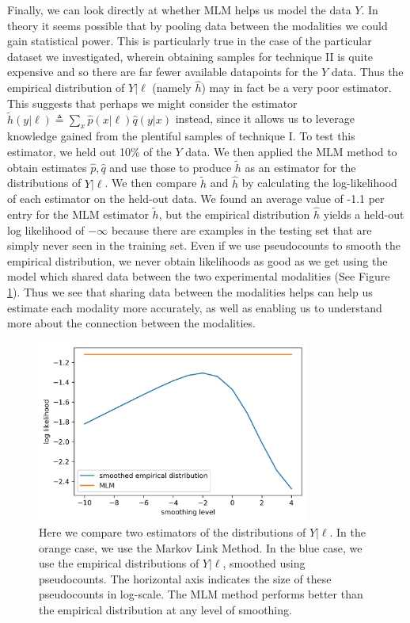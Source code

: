 Finally, we can look directly at whether MLM helps us model the data $Y$.  In theory it seems possible that by pooling data between the modalities we could gain statistical power.  This is particularly true in the case of the particular dataset we investigated, wherein obtaining samples for technique II is quite expensive and so there are far fewer available datapoints for the $Y$ data.  Thus the empirical distribution of $Y|\ell$ (namely $\hat h$) may in fact be a very poor estimator.  This suggests that perhaps we might consider the estimator $\tilde h(y|\ell)\triangleq \sum_x \hat p(x|\ell) \hat q(y|x)$ instead,  since it allows us to leverage knowledge gained from the plentiful samples of technique I.  To test this estimator, we held out 10\% of the $Y$ data.  We then applied the MLM method to obtain estimates $\hat p,\hat q$ and use those to produce $\tilde h$ as an estimator for the distributions of $Y|\ell$.  We then compare $\tilde h$ and $\hat h$ by calculating the log-likelihood of each estimator on the held-out data.  We found an average value of -1.1 per entry for the MLM estimator $\tilde h$, but the empirical distribution $\hat h$ yields a held-out log likelihood of $-\infty$ because there are examples in the testing set that are simply never seen in the training set.  Even if we use pseudocounts to smooth the empirical distribution, we never obtain likelihoods as good as we get using the model which shared data between the two experimental modalities (See Figure \ref{fig:heldout}).  Thus we see that sharing data between the modalities helps can help us estimate each modality more accurately, as well as enabling us to understand more about the connection between the modalities.

\begin{figure}
\includegraphics[width=0.8\textwidth]{pics/allenheldout}
\caption{Here we compare two estimators of the distributions of $Y|\ell$.  In the orange case, we use the Markov Link Method.  In the blue case, we use the empirical distributions of $Y|\ell$, smoothed using pseudocounts.  The horizontal axis indicates the size of these pseudocounts in log-scale.  The MLM method performs better than the empirical distribution at any level of smoothing. \label{fig:heldout}}
\end{figure}

